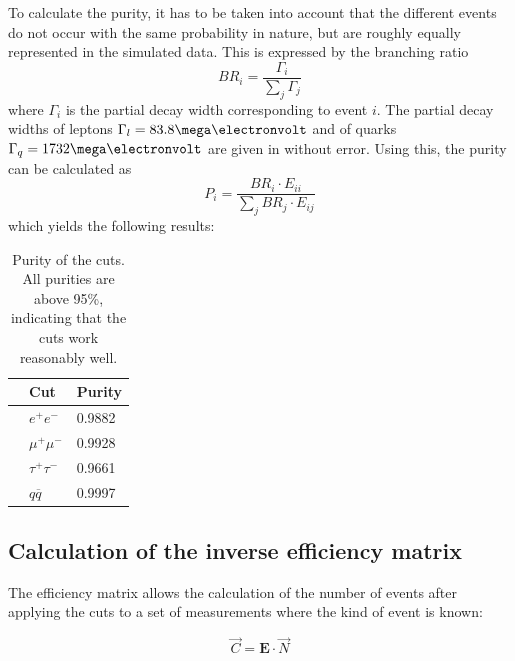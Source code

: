To calculate the purity, it has to be taken into account that the different events do not occur with the same probability in nature, but are roughly equally represented in the simulated data. This is expressed by the branching ratio
\begin{equation}
BR_i=\frac{\Gamma_i}{\sum_{j}\Gamma_{j}}
\end{equation}
where $\Gamma_i$ is the partial decay width corresponding to event $i$. The partial decay widths of leptons $\Gamma_l=\unit{83.8}{\mega\electronvolt}$ and of quarks $\Gamma_q=\unit{1732}{\mega\electronvolt}$ are given in \cite{staatsex} without error.
Using this, the purity can be calculated as
\begin{equation}
P_i=\frac{BR_i\cdot E_{ii}}{\sum_{j}BR_j\cdot E_{ij}}
\end{equation}
which yields the following results:

\begin{table}[H]\centering
	\begin{tabular}{@{}lll@{}}
		\toprule
		&Cut&Purity\\
		\midrule
		&$e^+e^-$&0.9882\\
		&$\mu^+\mu^-$&0.9928\\
		&$\tau^+\tau^-$&0.9661\\
		&$q\overline{q}$&0.9997\\
		\bottomrule
	\end{tabular}
	\caption[Purity of the cuts]{Purity of the cuts. All purities are above 95\%, indicating that the cuts work reasonably well.}
	\label{tb:purity}
\end{table}

\subsection{Calculation of the inverse efficiency matrix}
The efficiency matrix allows the calculation of the number of events after applying the cuts to a set of measurements where the kind of event is known:

\begin{equation}
\vec{C}=\boldsymbol{E}\cdot\vec{N}
\end{equation} 

